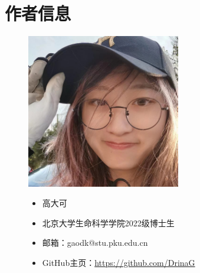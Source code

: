 \chapter*{作者信息}
\label{aupage}
\begin{figure}[ht]
    \hfill
    \begin{minipage}[c]{0.4\textwidth}
        \includegraphics[width=0.6\textwidth]{./image/author/author-gdk.jpg}
    \end{minipage}
    \hfil
    \begin{minipage}[c]{0.5\textwidth}
        \begin{itemize}
            \item 高大可
            \item 北京大学生命科学学院2022级博士生
            \item 邮箱：gaodk@stu.pku.edu.cn
            \item GitHub主页：\href{https://github.com/DrinaG}{https://github.com/DrinaG}
        \end{itemize}
    \end{minipage}
    \vspace{0.5cm}


\end{figure}
